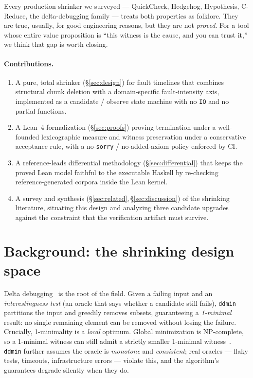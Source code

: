 \documentclass[10pt,twocolumn,letterpaper]{article}
\begin{document}
Every production shrinker we surveyed --- QuickCheck, Hedgehog, Hypothesis,
C-Reduce, the delta-debugging family --- treats both properties as folklore.
They are true, usually, for good engineering reasons, but they are not
\emph{proved}. For a tool whose entire value proposition is ``this witness is
the cause, and you can trust it,'' we think that gap is worth closing.

\paragraph{Contributions.}
\begin{enumerate}[leftmargin=1.4em,itemsep=1pt,topsep=2pt]
\item A pure, total shrinker (\S\ref{sec:design}) for fault timelines that
combines structural chunk deletion with a domain-specific fault-intensity axis,
implemented as a candidate / observe state machine with no \texttt{IO} and no
partial functions.
\item A Lean~4 formalization (\S\ref{sec:proofs}) proving termination under a
well-founded lexicographic measure and witness preservation under a conservative
acceptance rule, with a no-\texttt{sorry} / no-added-axiom policy enforced by CI.
\item A reference-leads differential methodology (\S\ref{sec:differential}) that
keeps the proved Lean model faithful to the executable Haskell by re-checking
reference-generated corpora inside the Lean kernel.
\item A survey and synthesis (\S\ref{sec:related},\,\S\ref{sec:discussion}) of
the shrinking literature, situating this design and analyzing three candidate
upgrades against the constraint that the verification artifact must survive.
\end{enumerate}

\section{Background: the shrinking design space}\label{sec:background}
Delta debugging~\cite{zeller1999yesterday,zeller2002ddmin} is the root of the
field. Given a failing input and an \emph{interestingness test} (an oracle that
says whether a candidate still fails), \texttt{ddmin} partitions the input and
greedily removes subsets, guaranteeing a \emph{1-minimal} result: no single
remaining element can be removed without losing the failure. Crucially,
1-minimality is a \emph{local} optimum. Global minimization is NP-complete, so a
1-minimal witness can still admit a strictly smaller 1-minimal
witness~\cite{zeller2002ddmin,vince2022iterating}. \texttt{ddmin} further assumes
the oracle is \emph{monotone} and \emph{consistent}; real oracles --- flaky
tests, timeouts, infrastructure errors --- violate this, and the algorithm's
guarantees degrade silently when they do.
\end{document}

